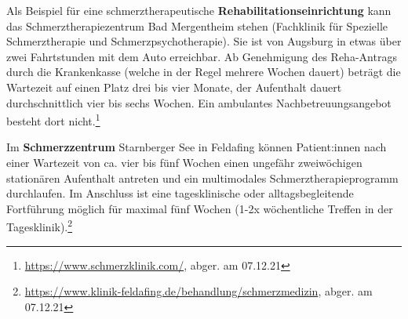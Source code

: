 \documentclass[
  twoside,
  parskip=half-,
  paper=176mm:246mm,
  BCOR=14mm,
  DIV=14,
]{scrreprt}
\begin{document}
Als Beispiel für eine schmerztherapeutische \textbf{Rehabilitationseinrichtung} kann das Schmerztherapiezentrum Bad Mergentheim stehen (Fachklinik für Spezielle Schmerztherapie und Schmerzpsychotherapie). Sie ist von Augsburg in etwas über zwei Fahrtstunden mit dem Auto erreichbar. Ab Genehmigung des Reha-Antrags durch die Krankenkasse (welche in der Regel mehrere Wochen dauert) beträgt die Wartezeit auf einen Platz drei bis vier Monate, der Aufenthalt dauert durchschnittlich vier bis sechs Wochen. Ein ambulantes Nachbetreuungsangebot besteht dort nicht.\footnote{\url{https://www.schmerzklinik.com/}, abger. am 07.12.21}

Im \textbf{Schmerzzentrum} Starnberger See in Feldafing können Patient:innen nach einer Wartezeit von ca. vier bis fünf Wochen einen ungefähr zweiwöchigen stationären Aufenthalt antreten und ein multimodales Schmerztherapieprogramm durchlaufen. Im Anschluss ist eine tagesklinische oder alltagsbegleitende Fortführung möglich für maximal fünf Wochen (1-2x wöchentliche Treffen in der Tagesklinik).\footnote{\url{https://www.klinik-feldafing.de/behandlung/schmerzmedizin}, abger. am 07.12.21}
\end{document}
